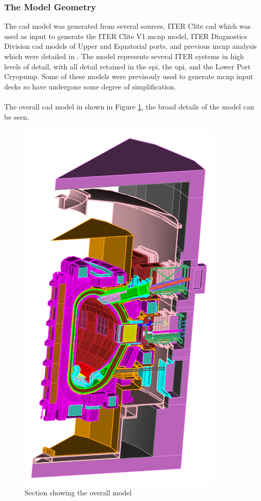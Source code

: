 \documentclass[12pt]{article}
\begin{document}
\subsubsection{The Model Geometry}
The \gls{cad} model was generated from several sources, ITER Clite \gls{cad}
which was used as input to generate the ITER Clite V1 \gls{mcnp} model, ITER
Diagnostics Division \gls{cad} models of Upper and Equatorial ports, and
previous \gls{mcnp} analysis which were detailed in \cite{cad_origination}. The
model represents several ITER systems in high levels of detail, with all detail
retained in the \gls{epi}, the  \gls{upi}, and the Lower Port Cryopump. Some of
these models were previsouly used to generate \gls{mcnp} input decks so have
undergone some degree of simplification.
\\
\\
The overall \gls{cad} model in shown in Figure \ref{fig:cad_iter_global}, the
broad details of the model can be seen. 
\begin{figure}[ht!]
  \centering
  \includegraphics[scale=0.8]{../plots/cad/global.png}
  \caption{Section showing the overall model}
  \label{fig:cad_iter_global}
\end{figure}
\end{document}
